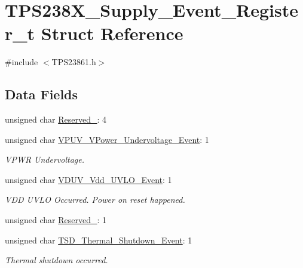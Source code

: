 \hypertarget{struct_t_p_s238_x___supply___event___register__t}{\section{T\-P\-S238\-X\-\_\-\-Supply\-\_\-\-Event\-\_\-\-Register\-\_\-t Struct Reference}
\label{struct_t_p_s238_x___supply___event___register__t}
}


{\ttfamily \#include $<$T\-P\-S23861.\-h$>$}

\subsection*{Data Fields}
\begin{DoxyCompactItemize}
\item 
unsigned char \hyperlink{struct_t_p_s238_x___supply___event___register__t_a6e678b8bd6c99ccdb80b015ffd83a53c}{Reserved\-\_}\-: 4
\item 
unsigned char \hyperlink{struct_t_p_s238_x___supply___event___register__t_ac6fcee7fc4bb8175466aebc576b07772}{V\-P\-U\-V\-\_\-\-V\-Power\-\_\-\-Undervoltage\-\_\-\-Event}\-: 1
\begin{DoxyCompactList}\small\item\em V\-P\-W\-R Undervoltage. \end{DoxyCompactList}\item 
unsigned char \hyperlink{struct_t_p_s238_x___supply___event___register__t_abab65a098bb6bdcb452e96dbf4aca4e6}{V\-D\-U\-V\-\_\-\-Vdd\-\_\-\-U\-V\-L\-O\-\_\-\-Event}\-: 1
\begin{DoxyCompactList}\small\item\em V\-D\-D U\-V\-L\-O Occurred. Power on reset happened. \end{DoxyCompactList}\item 
unsigned char \hyperlink{struct_t_p_s238_x___supply___event___register__t_aaa18a578d997b01aeb1c13f83d0d2dcb}{Reserved\-\_}\-: 1
\item 
unsigned char \hyperlink{struct_t_p_s238_x___supply___event___register__t_a67952a82b6fc18287db34835bd8dbdf9}{T\-S\-D\-\_\-\-Thermal\-\_\-\-Shutdown\-\_\-\-Event}\-: 1
\begin{DoxyCompactList}\small\item\em Thermal shutdown occurred. \end{DoxyCompactList}\end{DoxyCompactItemize}


